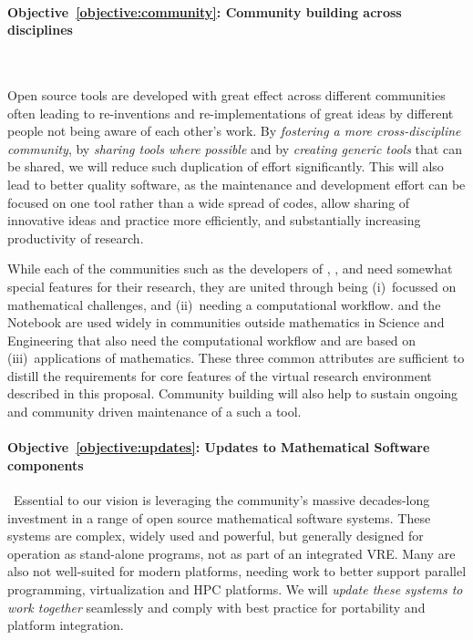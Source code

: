 \documentclass[noworkareas,deliverables,\classoptions]{euproposal}       %
\begin{document}
\begin{proposal}
\paragraph{Objective~\ref{objective:community}: Community building across disciplines}\ 


Open source tools are developed with great effect across different
communities often leading to re-inventions and re-implementations of
great ideas by different people not being aware of each other's work. By
\emph{fostering a more cross-discipline community}, by \emph{sharing tools where
possible} and by \emph{creating generic tools} that can be shared,
we will reduce such duplication of effort significantly. This will
also lead to better quality software, as the maintenance and
development effort can be focused on one tool rather than a wide
spread of codes, allow sharing of innovative ideas and practice more
efficiently, and substantially increasing productivity of research.

While each of the communities such as the developers of \Sage, \Singular, and \GAP need
somewhat special features for their research, they are united through
being (i)~focussed on mathematical challenges, and (ii)~needing a
computational workflow. \IPython and the \Jupyter Notebook are used
widely in communities outside mathematics in Science and Engineering
that also need the computational workflow and are based on
(iii)~applications of mathematics. These three common attributes are
sufficient to distill the requirements for core features of the
virtual research environment described in this
proposal. Community building will also help to sustain ongoing and
community driven maintenance of a such a tool.



\paragraph{Objective~\ref{objective:updates}: Updates to Mathematical
  Software components}\
Essential to our vision is leveraging the community's massive
decades-long investment in a range of open source mathematical
software systems. These systems are complex, widely used and powerful,
but generally designed for operation as stand-alone programs, not as
part of an integrated VRE. Many are also not well-suited for modern
platforms, needing work to better support parallel programming,
virtualization and HPC platforms. We will \emph{update these systems to work
together} seamlessly and comply with best practice for portability and
platform integration.



\end{proposal}
\end{document}
